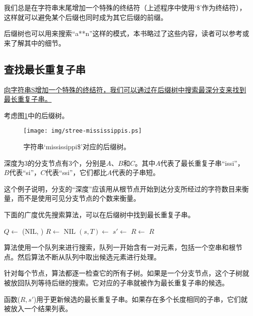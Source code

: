 \documentclass[UTF8]{article}
\begin{document}
我们总是在字符串末尾增加一个特殊的终结符（上述程序中使用‘\$’作为终结符），这样就可以避免某个后缀也同时成为其它后缀的前缀\cite{wiki-suffix-tree}。

后缀树也可以用来搜索“a**n”这样的模式，本书略过了这些内容，读者可以参考\cite{ukkonen-lec}或\cite{ukkonen-search}来了解其中的细节。

\subsection{查找最长重复子串}
\underline{向字符串S增加一个特殊的终结符，我们可以通过在后缀树中搜索最深分支来找到最长重复子串。}

考虑图\ref{fig:stree-mississippis}中的后缀树。

\begin{figure}[htbp]
  \centering
  \texttt{[image: img/stree-mississippis.ps]}
  \caption{字符串‘mississippi\$’对应的后缀树。} \label{fig:stree-mississippis}
\end{figure}

深度为3的分支节点有3个，分别是$A$、$B$和$C$。其中$A$代表了最长重复子串“issi”，$B$代表“si”，$C$代表“ssi”，它们都比$A$代表的子串短。

这个例子说明，分支的“深度”应该用从根节点开始到达分支所经过的字符数目来衡量，而不是使用可见分支节点的个数来衡量。

下面的广度优先搜索算法，可以在后缀树中找到最长重复子串。

\begin{algorithmic}[1]
  \State $Q \gets$ (NIL, )
  \State $R \gets$ NIL
    \State $(s, T) \gets$ 
        \State $s' \gets$ 
        \State {}
        \State $R \gets$ 
      \EndIf
    \EndFor
  \EndWhile
  \State \Return $R$
\EndFunction
\end{algorithmic}

算法使用一个队列来进行搜索，队列一开始含有一对元素，包括一个空串和根节点。然后算法不断从队列中取出候选元素进行处理。

针对每个节点，算法都逐一检查它的所有子树。如果是一个分支节点，这个子树就被放回队列等待后继的搜索。它对应的子串就被作为最长重复子串的候选。

函数($R, s'$)用于更新候选的最长重复子串。如果存在多个长度相同的子串，它们就被放入一个结果列表。
\end{document}
